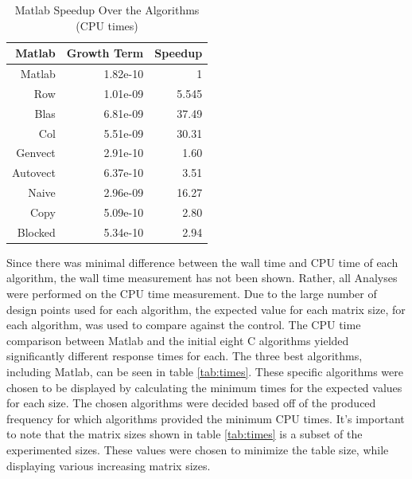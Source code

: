 \documentclass[sigconf]{acmart}
\begin{document}
\begin{table}
  \caption{Matlab Speedup Over the Algorithms (CPU times)}
  \label{tab:speedup}
  \begin{tabular}{rrr}
    \toprule
    Matlab&Growth Term&Speedup\\
    \midrule
    Matlab   & 1.82e-10 & 1 \\
    Row      & 1.01e-09 & 5.545 \\
    Blas     & 6.81e-09 & 37.49 \\
    Col      & 5.51e-09 & 30.31 \\
    Genvect  & 2.91e-10 & 1.60 \\
    Autovect & 6.37e-10 & 3.51 \\
    Naive    & 2.96e-09 & 16.27 \\
    Copy     & 5.09e-10 & 2.80 \\
    Blocked  & 5.34e-10  & 2.94 \\
  \bottomrule
\end{tabular}
\end{table}

Since there was minimal difference between the wall time and CPU time of each algorithm, the wall time measurement has not been shown. Rather, all Analyses were performed on the CPU time measurement. Due to the large number of design points used for each algorithm, the expected value for each matrix size, for each algorithm, was used to compare against the control. The CPU time comparison between Matlab and the initial eight C algorithms yielded significantly different response times for each. The three best algorithms, including Matlab, can be seen in table \ref{tab:times}. These specific algorithms were chosen to be displayed by calculating the minimum times for the expected values for each size. The chosen algorithms were decided based off of the produced frequency for which algorithms provided the minimum CPU times. It's important to note that the matrix sizes shown in table \ref{tab:times} is a subset of the experimented sizes. These values were chosen to minimize the table size, while displaying various increasing matrix sizes.
\end{document}
